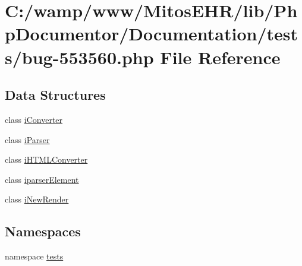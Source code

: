 \hypertarget{bug-553560_8php}{\section{\-C\-:/wamp/www/\-Mitos\-E\-H\-R/lib/\-Php\-Documentor/\-Documentation/tests/bug-\/553560.php \-File \-Reference}
\label{bug-553560_8php}
}
\subsection*{\-Data \-Structures}
\begin{DoxyCompactItemize}
\item 
class \hyperlink{classi_converter}{i\-Converter}
\item 
class \hyperlink{classi_parser}{i\-Parser}
\item 
class \hyperlink{classi_h_t_m_l_converter}{i\-H\-T\-M\-L\-Converter}
\item 
class \hyperlink{classiparser_element}{iparser\-Element}
\item 
class \hyperlink{classi_new_render}{i\-New\-Render}
\end{DoxyCompactItemize}
\subsection*{\-Namespaces}
\begin{DoxyCompactItemize}
\item 
namespace \hyperlink{namespacetests}{tests}
\end{DoxyCompactItemize}
